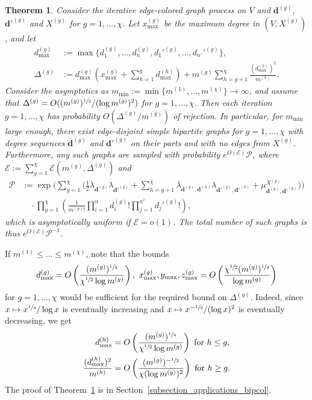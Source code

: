\documentclass{article}
\theoremstyle{plain}
\newtheorem{theorem}{Theorem}[section]
\theoremstyle{remark}
\theoremstyle{plain}
\numberwithin{equation}{section}
\renewcommand{\d}{{\boldsymbol{d}}}
\begin{document}
	\begin{theorem}\label{theorem_bipcol}
		Consider the iterative edge-colored graph process on $V$ and $\d^{(g)}$, $\d'^{(g)}$ and $X^{(g)}$ for $g=1,\ldots,\chi$. Let $x_{\max}^{(g)}$ be the maximum degree in $(V,X^{(g)})$, and let
		\begin{align}
			d_{\max}^{(g)}&:=\max\{d_1^{(g)},\ldots,d_n^{(g)},d_1'^{(g)},\ldots,d_{n'}'^{(g)}\},
			\\\Delta^{(g)}&:=d_{\max}^{(g)}\left(x_{\max}^{(g)}+\sum_{h=1}^{g}d_{\max}^{(h)}\right)+m^{(g)}\sum_{h=g+1}^{\chi}\frac{(d_{\max}^{(h)})^2}{m^{(h)}}.
		\end{align}
		Consider the asymptotics as $m_{\min}:=\min\{m^{(1)},\ldots,m^{(\chi)}\}\to\infty$, and assume that $\Delta^{(g)}=O((m^{(g)})^{\sfrac12}/(\log m^{(g)})^2)$ for $g=1,\ldots,\chi$. Then each iteration $g=1,\ldots,\chi$ has probability $O(\Delta^{(g)}/m^{(g)})$ of rejection. In particular, for $m_{\min}$ large enough, there exist edge-disjoint simple bipartite graphs for $g=1,\ldots,\chi$ with degree sequences $\d^{(g)}$ and $\d'^{(g)}$ on their parts and with no edges from $X^{(g)}$. Furthermore, any such graphs are sampled with probability $e^{O(\mathscr{E})}\mathscr{P}$, where $\mathscr{E}:=\sum_{g=1}^{\chi}\mathscr{E}(m^{(g)},\Delta^{(g)})$ and
		\begin{align}
			\mathscr{P}&:=\exp\Bigg(\sum_{g=1}^{\chi}\Bigg(\tfrac12\lambda_{\d^{(g)}}\lambda_{\d'^{(g)}}+\sum_{h=g+1}^{\chi}\lambda_{\d^{(g)},\d^{(h)}}\lambda_{\d'^{(g)},\d'^{(h)}}+\mu_{\d^{(g)},\d'^{(g)}}^{X^{(g)}}\Bigg)\Bigg)
			\\&\quad\cdot\prod_{g=1}^{\chi}\left(\frac1{m^{(g)}!}\prod_{i=1}^{n}d_i^{(g)}!\prod_{j=1}^{n'}d_j'^{(g)}!\right),
		\end{align}
		which is asymptotically uniform if $\mathscr{E}=o(1)$. The total number of such graphs is thus $e^{O(\mathscr{E})}\mathscr{P}^{-1}$.
	\end{theorem}
	
	If $m^{(1)}\leq\ldots\leq m^{(\chi)}$, note that the bounds $$d_{\max}^{(g)}=O\left(\frac{(m^{(g)})^{\sfrac14}}{\chi^{\sfrac12}\log m^{(g)}}\right),\ x_{\max}^{(g)},y_{\max},z_{\max}^{(g)}=O\left(\frac{\chi^{\sfrac12}(m^{(g)})^{\sfrac14}}{\log m^{(g)}}\right)$$ for $g=1,\ldots,\chi$ would be sufficient for the required bound on $\Delta^{(g)}$. Indeed, since $x\mapsto x^{\sfrac14}/\log x$ is eventually increasing and $x\mapsto x^{-\sfrac12}/(\log x)^2$ is eventually decreasing, we get
	\begin{align}
		d_{\max}^{(h)}&=O\left(\frac{(m^{(g)})^{\sfrac14}}{\chi^{\sfrac12}\log m^{(g)}}\right)\ \text{for}\ h\leq g,
		\\\frac{(d_{\max}^{(h)})^2}{m^{(h)}}&=O\left(\frac{(m^{(g)})^{-\sfrac12}}{\chi(\log m^{(g)})^2}\right)\ \text{for}\ h\geq g.
	\end{align}
	The proof of Theorem~\ref{theorem_bipcol} is in Section~\ref{subsection_applications_bipcol}.
	
\end{document}
